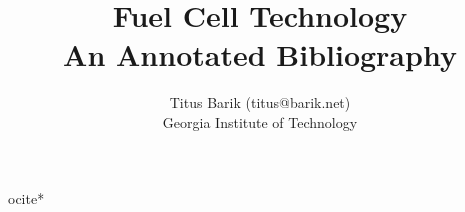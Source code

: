 \documentclass [11pt]{article}
\title{Fuel Cell Technology\\\medskip An Annotated Bibliography}
\author{Titus Barik (titus@barik.net)\\Georgia Institute of Technology}
\begin{document}
\maketitle

ocite{*}


\end{document}
